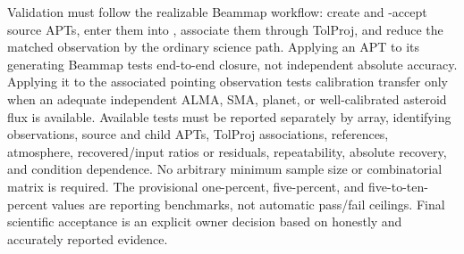 \begin{description}[style=nextline]
\item[\Req{050}: falsifiability before qualification.]
  Validation must follow the realizable Beammap workflow: create and
  -accept source APTs, enter them into ,
  associate them through TolProj, and reduce the matched observation by the
  ordinary science path. Applying an APT to its generating Beammap tests
  end-to-end closure, not independent absolute accuracy. Applying it to the
  associated pointing observation tests calibration transfer only when an
  adequate independent ALMA, SMA, planet, or well-calibrated asteroid flux is
  available. Available tests must be reported separately by array, identifying
  observations, source and child APTs, TolProj associations, references,
  atmosphere, recovered/input ratios or residuals, repeatability, absolute
  recovery, and condition dependence. No arbitrary minimum sample size or
  combinatorial matrix is required. The provisional one-percent,
  five-percent, and five-to-ten-percent values are reporting benchmarks, not
  automatic pass/fail ceilings. Final scientific acceptance is an explicit
  owner decision based on honestly and accurately reported evidence.
\end{description}
